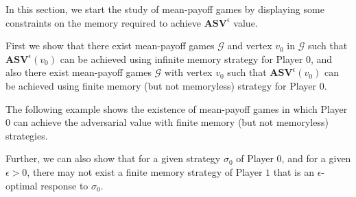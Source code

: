 In this section, we start the study of mean-payoff games by displaying some constraints on the memory required to achieve $\mathbf{ASV}^{\epsilon}$ value.

First we show that there exist mean-payoff games $\mathcal{G}$ and vertex $v_0$ in $\mathcal{G}$ such that $\mathbf{ASV}^{\epsilon}(v_0)$ can be achieved using infinite memory strategy for Player $0$, and also there exist mean-payoff games $\mathcal{G}$ with vertex $v_0$ such that $\mathbf{ASV}^{\epsilon}(v_0)$ can be achieved using finite memory (but not memoryless) strategy for Player $0$.



The following example shows the existence of mean-payoff games in which Player $0$ can achieve the adversarial value with finite memory (but not memoryless) strategies.



Further, we can also show that for a given strategy $\sigma_0$ of Player $0$, and for a given $\epsilon > 0$, there may not exist a finite memory strategy of Player $1$ that is an $\epsilon$-optimal response to $\sigma_0$.

